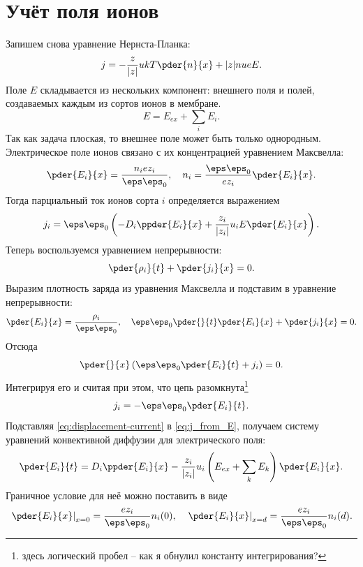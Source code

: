 \section{Учёт поля ионов}
    Запишем снова уравнение Нернста-Планка:
    \begin{equation}
        j = -\frac{z}{|z|}ukT\pder{n}{x} + |z|nueE.
    \end{equation}
    Поле \( E \) складывается из нескольких компонент: внешнего поля и полей,
    создаваемых каждым из сортов ионов в мембране.
    \begin{equation}
        E = E_{ex} + \sum_{i} E_i.
    \end{equation}
    Так как задача плоская, то внешнее поле может быть только однородным.
    Электрическое поле ионов связано с их концентрацией уравнением Максвелла:
    \begin{equation}
        \pder{E_i}{x} = \frac{n_iez_i}{\eps\eps_0},\quad
        n_i = \frac{\eps\eps_0}{ez_i}\pder{E_i}{x}.
    \end{equation}
    Тогда парциальный ток ионов сорта \( i \) определяется выражением
    \begin{equation}
        j_i = \eps\eps_0
            \left(-D_i\ppder{E_i}{x}+\frac{z_i}{|z_i|}u_iE\pder{E_i}{x}\right).
        \label{eq:j_from_E}
    \end{equation}
    Теперь воспользуемся уравнением непрерывности:
    \begin{equation}
        \pder{\rho_i}{t} + \pder{j_i}{x} = 0.
    \end{equation}
    Выразим плотность заряда из уравнения Максвелла и подставим в уравнение
    непрерывности:
    \begin{equation}
        \pder{E_i}{x} = \frac{\rho_i}{\eps\eps_0},\quad
        \eps\eps_0\pder{}{t}\pder{E_i}{x} + \pder{j_i}{x} = 0.
    \end{equation}
    Отсюда
    \begin{equation}
        \pder{}{x}\left(\eps\eps_0\pder{E_i}{t} + j_i\right) = 0.
    \end{equation}
    Интегрируя его и считая при этом, что цепь разомкнута\footnote{здесь
    логический пробел -- как я обнулил константу интегрирования?}
    \begin{equation}
        j_i = -\eps\eps_0\pder{E_i}{t}.
        \label{eq:displacement-current}
    \end{equation}
    Подставляя \eqref{eq:displacement-current} в \eqref{eq:j_from_E}, получаем
    систему уравнений конвективной диффузии для электрического поля:
    \begin{equation}
        \pder{E_i}{t} = D_i\ppder{E_i}{x} -
        \frac{z_i}{|z_i|}u_i\left(E_{ex} + \sum_{k} E_k\right)\pder{E_i}{x}.
    \end{equation}
    Граничное условие для неё можно поставить в виде
    \begin{equation}
        \left.\pder{E_i}{x}\right|_{x=0} = \frac{ez_i}{\eps\eps_0}n_i(0),\quad
        \left.\pder{E_i}{x}\right|_{x=d} = \frac{ez_i}{\eps\eps_0}n_i(d).
    \end{equation}

